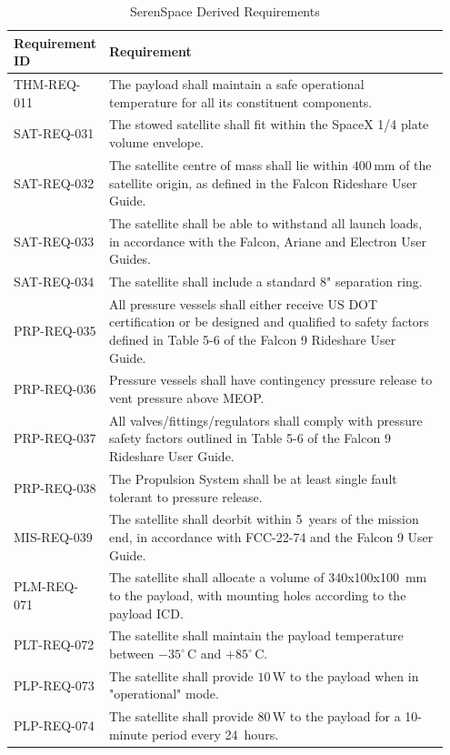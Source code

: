 \documentclass[a4paper, 11pt, conference]{IEEEtran}
\begin{document}
\begin{table}[H]
\centering
\caption{SerenSpace Derived Requirements}
\label{tab:serenspace-reqs}
\footnotesize
\renewcommand{\arraystretch}{1.2}
\begin{tabular}{@{}p{0.15\linewidth}p{0.80\linewidth}@{}}
\toprule
\textbf{Requirement ID} & \textbf{Requirement} \\
\midrule
THM-REQ-011 & The payload shall maintain a safe operational temperature for all its constituent components. \\
SAT-REQ-031 & The stowed satellite shall fit within the SpaceX 1/4 plate volume envelope. \\
SAT-REQ-032 & The satellite centre of mass shall lie within $400\,\mathrm{mm}$ of the satellite origin, as defined in the Falcon Rideshare User Guide. \\
SAT-REQ-033 & The satellite shall be able to withstand all launch loads, in accordance with the Falcon, Ariane and Electron User Guides. \\
SAT-REQ-034 & The satellite shall include a standard 8" separation ring. \\
PRP-REQ-035 & All pressure vessels shall either receive US DOT certification or be designed and qualified to safety factors defined in Table 5-6 of the Falcon 9 Rideshare User Guide. \\
PRP-REQ-036 & Pressure vessels shall have contingency pressure release to vent pressure above MEOP. \\
PRP-REQ-037 & All valves/fittings/regulators shall comply with pressure safety factors outlined in Table 5-6 of the Falcon 9 Rideshare User Guide. \\
PRP-REQ-038 & The Propulsion System shall be at least single fault tolerant to pressure release. \\
MIS-REQ-039 & The satellite shall deorbit within 5~years of the mission end, in accordance with FCC-22-74 and the Falcon 9 User Guide. \\
PLM-REQ-071 & The satellite shall allocate a volume of 340x100x100~mm to the payload, with mounting holes according to the payload ICD. \\
PLT-REQ-072 & The satellite shall maintain the payload temperature between $-35^\circ\,\mathrm{C}$ and $+85^\circ\,\mathrm{C}$. \\
PLP-REQ-073 & The satellite shall provide $10\,\mathrm{W}$ to the payload when in "operational" mode. \\
PLP-REQ-074 & The satellite shall provide $80\,\mathrm{W}$ to the payload for a 10-minute period every 24~hours. \\

\end{tabular}
\end{table}
\end{document}
